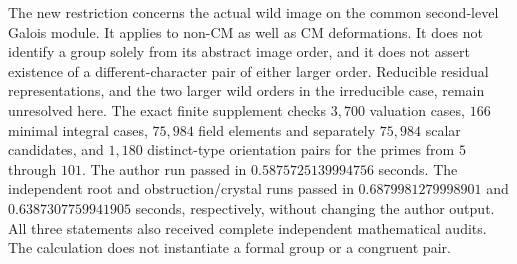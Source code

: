 \begin{remark}
\label{rem:B-RD55-scope}
The new restriction concerns the actual wild image on the
common second-level Galois module. It applies to non-CM as
well as CM deformations. It does not identify a group solely
from its abstract image order, and it does not assert existence
of a different-character pair of either larger order.
Reducible residual representations, and the two larger wild
orders in the irreducible case, remain unresolved here.
The exact finite supplement
checks $3{,}700$ valuation cases, $166$ minimal integral cases,
$75{,}984$ field elements and separately $75{,}984$ scalar
candidates, and $1{,}180$
distinct-type orientation pairs for the primes from $5$ through
$101$. The author run passed in $0.5875725139994756$ seconds.
The independent root and obstruction/crystal runs passed in
$0.6879981279998901$ and $0.6387307759941905$ seconds,
respectively, without changing the author output. All three
statements also received complete independent mathematical audits.
The calculation does not instantiate a formal group or a congruent pair.
\end{remark}

